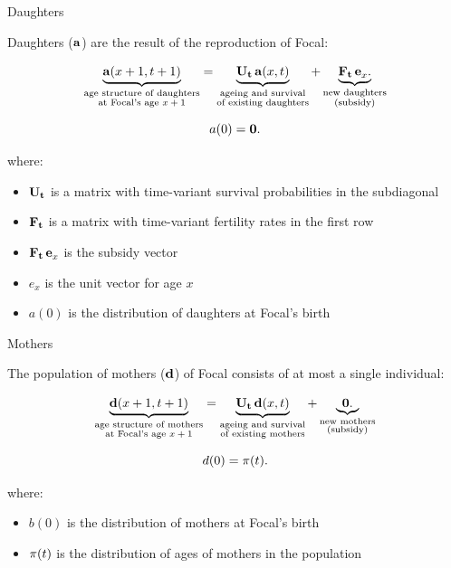﻿\documentclass{beamer}
\begin{document}
\begin{frame}{Daughters}

Daughters ($\bf a$) are the result of the reproduction of Focal:

    \begin{equation}
    	\underbrace{{\bf a}(x+1,t+1)}_{\substack{\text{age structure of daughters}\\ \text{at Focal's age $x+1$}}} = 	
    \underbrace{{\bf U_t \, a}(x,t)}_{\substack{\text{ageing and survival}\\ \text{of existing daughters}}}
    + 	\underbrace{	{\bf F_t \, e}_x.}_{\substack{\text{new daughters}\\ \text{(subsidy)}}}
\end{equation}

\begin{equation*}
    a(0) = {\bf 0}.
\end{equation*}

where:
\begin{itemize}
    \item ${\bf U_t}$ is a matrix with time-variant survival probabilities in the subdiagonal
    \item ${\bf F_t}$ is a matrix with time-variant fertility rates in the first row
    \item ${\bf F_t \, e}_x$ is the subsidy vector
    \item $e_x$ is the unit vector for age $x$
    \item $a(0)$ is the distribution of daughters at Focal's birth
\end{itemize}

\end{frame}

\begin{frame}{Mothers}

 The population of mothers ($\bf d$) of Focal consists of at most a single
individual:

    \begin{equation}
    	\underbrace{{\bf d}(x+1,t+1)}_{\substack{\text{age structure of mothers}\\ \text{at Focal's age $x+1$}}} = 	
    \underbrace{{\bf U_t \, d}(x,t)}_{\substack{\text{ageing and survival}\\ \text{of existing mothers}}}
    + 	\underbrace{	{\bf 0}.}_{\substack{\text{new mothers}\\ \text{(subsidy)}}}
\end{equation}

\begin{equation*}
    d(0) = {\bf \pi}(t).
\end{equation*}

where:
\begin{itemize}
    \item $b(0)$ is the distribution of mothers at Focal's birth
    \item ${\bf \pi}(t)$ is the distribution of ages of mothers in the population
\end{itemize}

\end{frame}
\end{document}
